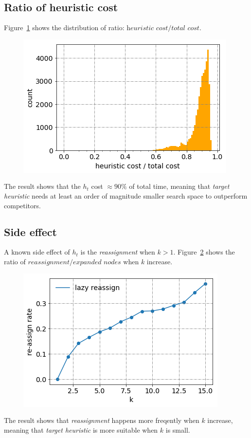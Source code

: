 \subsection{Ratio of heuristic cost}
Figure~\ref{hcost} shows the distribution of ratio:
$\textit{heuristic cost} / \textit{total cost}$.
\begin{figure}[htp]
  \centering
  \includegraphics[width=.7\linewidth]{./pic/hcost.png}
  \caption{}
  \label{hcost}
\end{figure}
The result shows that the $h_t$ cost $\approx 90\%$ of total time, meaning that
\textit{target heuristic} needs at least an order of magnitude smaller search space 
to outperform competitors.

\subsection{Side effect}
A known side effect of $h_t$ is the \textit{reassignment} when $k>1$.
Figure~\ref{lazy_reassign} shows the ratio of $\textit{reassignment} / \textit{expanded nodes}$ when $k$ increase.
\begin{figure}[htp]
  \centering
  \includegraphics[width=.7\linewidth]{./pic/lazy_reassign.png}
  \caption{}
  \label{lazy_reassign}
\end{figure}
The result shows that \textit{reassignment} happens more freqently when $k$
increase, meaning that \textit{target heuristic} is more suitable when $k$ is small.

